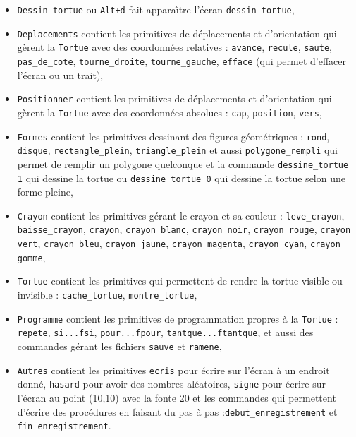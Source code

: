 \documentclass[a4paper,11pt]{book}
\begin{document}
\begin{itemize}
\item {\tt Dessin tortue} ou {\tt Alt+d} fait appara\^{\i}tre l'\'ecran 
{\tt dessin tortue},
\item {\tt Deplacements} contient les primitives de d\'eplacements et 
d'orientation  qui g\`erent la {\tt Tortue} avec des coordonn\'ees relatives : 
{\tt avance}, {\tt recule}, {\tt saute}, {\tt pas\_de\_cote}, 
{\tt tourne\_droite}, {\tt tourne\_gauche}, {\tt efface} (qui permet 
d'effacer l'\'ecran ou un trait),
\item {\tt Positionner} contient les primitives de d\'eplacements et 
d'orientation qui g\`erent la {\tt Tortue} avec des coordonn\'ees absolues : 
{\tt cap}, {\tt position}, {\tt vers},
\item {\tt Formes} contient les primitives dessinant des figures 
g\'eom\'etriques : {\tt rond}, {\tt disque}, {\tt rectangle\_plein}, 
{\tt triangle\_plein} et aussi {\tt polygone\_rempli} qui permet de remplir un
polygone quelconque et  la commande 
{\tt dessine\_tortue 1} qui dessine la tortue ou {\tt dessine\_tortue 0}
qui dessine la tortue selon une forme pleine, 
\item {\tt Crayon} contient les primitives g\'erant le crayon et sa couleur : 
{\tt leve\_crayon}, {\tt baisse\_crayon}, {\tt crayon}, {\tt crayon blanc}, 
{\tt crayon noir}, {\tt crayon rouge}, {\tt crayon vert}, {\tt crayon bleu}, 
{\tt crayon jaune}, {\tt crayon magenta}, {\tt crayon cyan}, {\tt crayon gomme},
\item {\tt Tortue} contient les primitives qui permettent de rendre la tortue 
visible ou invisible : {\tt cache\_tortue}, {\tt montre\_tortue},
\item {\tt Programme} contient les primitives de programmation propres \`a la 
{\tt Tortue} : {\tt repete}, {\tt si...fsi}, {\tt pour...fpour}, 
{\tt tantque...ftantque}, et aussi des 
commandes g\'erant les fichiers {\tt sauve} et {\tt ramene},
\item {\tt Autres} contient les primitives {\tt ecris} pour \'ecrire sur 
l'\'ecran \`a un endroit donn\'e, {\tt hasard} pour avoir des nombres 
al\'eatoires, {\tt signe} pour \'ecrire sur l'\'ecran au point (10,10) avec la 
fonte 20 et les commandes qui permettent d'\'ecrire des proc\'edures en faisant
 du pas \`a pas :{\tt debut\_enregistrement} et
{\tt fin\_enregistrement}.
\end{itemize}
\end{document}
